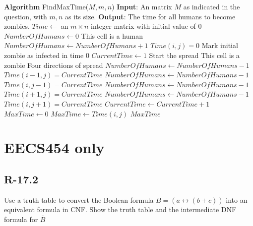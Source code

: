 \documentclass[11pt]{article}
\begin{document}
\begin{algorithmic}
	\State \textbf{Algorithm} FindMaxTime($M,m,n$)
	\State \textbf{Input}: An matrix $M$ as indicated in the question, with $m,n$ as its size.
	\State \textbf{Output}: The time for all humans to become zombies.
	\State $Time\gets$ an $m\times n$ integer matrix with initial value of $0$
	\State $NumberOfHumans\gets0$
			\Comment This cell is a human
				\State $NumberOfHumans \gets NumberOfHumans + 1$
			\EndIf
				\State $Time(i,j)=0$ \Comment Mark initial zombie as infected in time 0
			\EndIf
		\EndFor
	\EndFor
	\State
	\State $CurrentTime \gets 1$
	\Comment Start the spread
				\Comment This cell is a zombie
					 \Comment Four directions of spread
						\State $NumberOfHumans\gets NumberOfHumans -1$
						\State $Time(i-1,j)=CurrentTime$ 
					\EndIf
						\State $NumberOfHumans\gets NumberOfHumans -1$
						\State $Time(i,j-1)=CurrentTime$ 
					\EndIf
						\State $NumberOfHumans\gets NumberOfHumans -1$
						\State $Time(i+1,j)=CurrentTime$ 
					\EndIf
						\State $NumberOfHumans\gets NumberOfHumans -1$
						\State $Time(i,j+1)=CurrentTime$ 
					\EndIf
				\EndIf
			\EndFor
		\EndFor
		\State $CurrentTime\gets CurrentTime +1$
	\EndWhile
	\State
	\State $MaxTime \gets 0$
					\State $MaxTime \gets Time(i,j)$
				\EndIf
			\EndIf
		\EndFor
	\EndFor
	\State \Return $MaxTime$
\end{algorithmic}
\section{EECS454 only}
\subsection{R-17.2}
Use a truth table to convert the Boolean formula $B=(a\leftrightarrow(b+c))$ into an equivalent formula in CNF. Show the truth table and the intermediate DNF formula for $\overline{B}$
\end{document}
